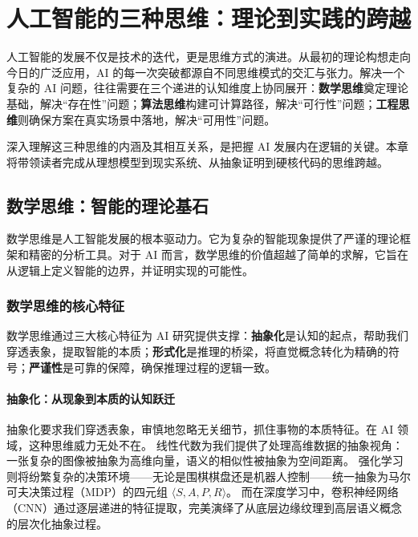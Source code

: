 \chapter{人工智能的三种思维：理论到实践的跨越}


人工智能的发展不仅是技术的迭代，更是思维方式的演进。从最初的理论构想走向今日的广泛应用，AI 的每一次突破都源自不同思维模式的交汇与张力。解决一个复杂的 AI 问题，往往需要在三个递进的认知维度上协同展开：\textbf{数学思维}奠定理论基础，解决“存在性”问题；\textbf{算法思维}构建可计算路径，解决“可行性”问题；\textbf{工程思维}则确保方案在真实场景中落地，解决“可用性”问题。

深入理解这三种思维的内涵及其相互关系，是把握 AI 发展内在逻辑的关键。本章将带领读者完成从理想模型到现实系统、从抽象证明到硬核代码的思维跨越。

\section{数学思维：智能的理论基石}

数学思维是人工智能发展的根本驱动力。它为复杂的智能现象提供了严谨的理论框架和精密的分析工具。对于 AI 而言，数学思维的价值超越了简单的求解，它旨在从逻辑上定义智能的边界，并证明实现的可能性。

\subsection{数学思维的核心特征}

数学思维通过三大核心特征为 AI 研究提供支撑：\textbf{抽象化}是认知的起点，帮助我们穿透表象，提取智能的本质；\textbf{形式化}是推理的桥梁，将直觉概念转化为精确的符号；\textbf{严谨性}是可靠的保障，确保推理过程的逻辑一致。

\subsubsection{抽象化：从现象到本质的认知跃迁}

抽象化要求我们穿透表象，审慎地忽略无关细节，抓住事物的本质特征。在 AI 领域，这种思维威力无处不在。
线性代数为我们提供了处理高维数据的抽象视角：一张复杂的图像被抽象为高维向量，语义的相似性被抽象为空间距离。
强化学习则将纷繁复杂的决策环境——无论是围棋棋盘还是机器人控制——统一抽象为马尔可夫决策过程（MDP）的四元组 $\langle S, A, P, R \rangle$。
而在深度学习中，卷积神经网络（CNN）通过逐层递进的特征提取，完美演绎了从底层边缘纹理到高层语义概念的层次化抽象过程。

